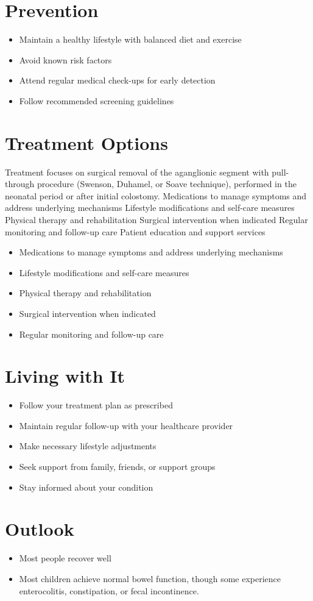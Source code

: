 \section{Prevention}
\begin{itemize}[noitemsep]
  \item Maintain a healthy lifestyle with balanced diet and exercise
  \item Avoid known risk factors
  \item Attend regular medical check-ups for early detection
  \item Follow recommended screening guidelines
\end{itemize}
\section{Treatment Options}
Treatment focuses on surgical removal of the aganglionic segment with pull-through procedure (Swenson, Duhamel, or Soave technique), performed in the neonatal period or after initial colostomy. Medications to manage symptoms and address underlying mechanisms Lifestyle modifications and self-care measures Physical therapy and rehabilitation Surgical intervention when indicated Regular monitoring and follow-up care Patient education and support services

\begin{itemize}[noitemsep]
  \item Medications to manage symptoms and address underlying mechanisms
  \item Lifestyle modifications and self-care measures
  \item Physical therapy and rehabilitation
  \item Surgical intervention when indicated
  \item Regular monitoring and follow-up care
\end{itemize}
\section{Living with It}
\begin{itemize}[noitemsep]
  \item Follow your treatment plan as prescribed
  \item Maintain regular follow-up with your healthcare provider
  \item Make necessary lifestyle adjustments
  \item Seek support from family, friends, or support groups
  \item Stay informed about your condition
\end{itemize}
\section{Outlook}
\begin{itemize}[noitemsep]
  \item Most people recover well
  \item Most children achieve normal bowel function, though some experience enterocolitis, constipation, or fecal incontinence.
\end{itemize}
